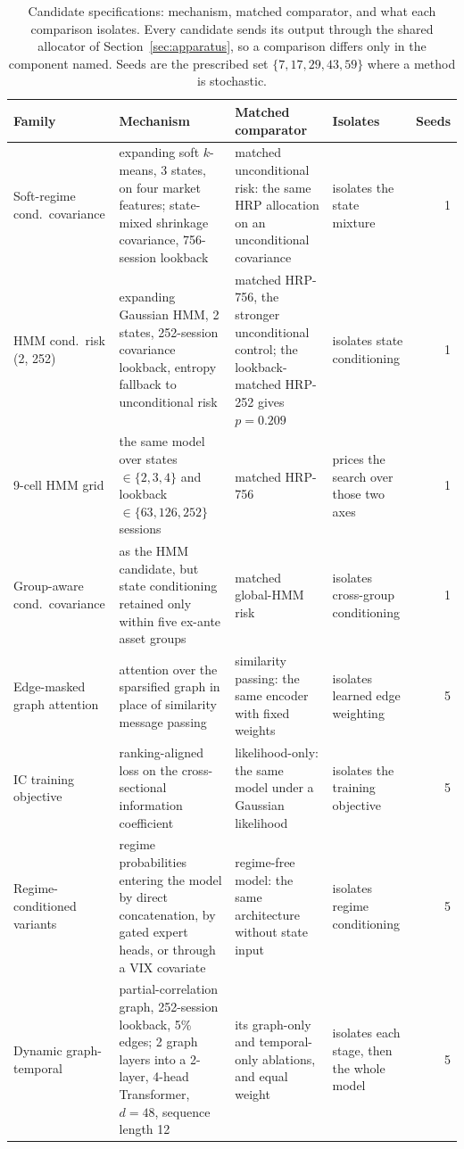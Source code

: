 \begin{table}[t]
\centering
\caption{Candidate specifications: mechanism, matched comparator, and what each
comparison isolates. Every candidate sends its output through the shared allocator of
Section~\ref{sec:apparatus}, so a comparison differs only in the component named.
Seeds are the prescribed set $\{7, 17, 29, 43, 59\}$ where a method is stochastic.}
\label{tab:spec}
\footnotesize
\begin{tabular}{p{2.7cm}p{5.1cm}p{4.0cm}p{2.9cm}r}
\toprule
Family & Mechanism & Matched comparator & Isolates & Seeds \\
\midrule
Soft-regime cond.\ covariance & expanding soft $k$-means, 3 states, on four market features; state-mixed shrinkage covariance, 756-session lookback & matched unconditional risk: the same HRP allocation on an unconditional covariance & isolates the state mixture & 1 \\
HMM cond.\ risk (2, 252) & expanding Gaussian HMM, 2 states, 252-session covariance lookback, entropy fallback to unconditional risk & matched HRP-756, the stronger unconditional control; the lookback-matched HRP-252 gives $p{=}0.209$ & isolates state conditioning & 1 \\
9-cell HMM grid & the same model over states $\in\{2,3,4\}$ and lookback $\in\{63,126,252\}$ sessions & matched HRP-756 & prices the search over those two axes & 1 \\
Group-aware cond.\ covariance & as the HMM candidate, but state conditioning retained only within five ex-ante asset groups & matched global-HMM risk & isolates cross-group conditioning & 1 \\
Edge-masked graph attention & attention over the sparsified graph in place of similarity message passing & similarity passing: the same encoder with fixed weights & isolates learned edge weighting & 5 \\
IC training objective & ranking-aligned loss on the cross-sectional information coefficient & likelihood-only: the same model under a Gaussian likelihood & isolates the training objective & 5 \\
Regime-conditioned variants & regime probabilities entering the model by direct concatenation, by gated expert heads, or through a VIX covariate & regime-free model: the same architecture without state input & isolates regime conditioning & 5 \\
Dynamic graph-temporal & partial-correlation graph, 252-session lookback, 5\% edges; 2 graph layers into a 2-layer, 4-head Transformer, $d{=}48$, sequence length 12 & its graph-only and temporal-only ablations, and equal weight & isolates each stage, then the whole model & 5 \\
\bottomrule
\end{tabular}
\end{table}
